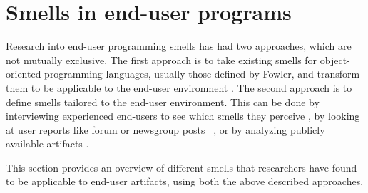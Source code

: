 \documentclass[10pt,conference,compsocconf]{IEEEtran}
\begin{document}
\section{Smells in end-user programs}
\label{sec:smells}
Research into end-user programming smells has had two approaches, which are not mutually exclusive.
The first approach is to take existing smells for object-oriented programming languages, usually those defined by Fowler, and transform them to be applicable to the end-user environment \cite{Hermans2012inter,Hermans2012intra,Stolee2011,StoleeTSE2013}.
The second approach is to define smells tailored to the end-user environment.
This can be done by interviewing experienced end-users to see which smells they perceive \cite{chambers2013smell}, by looking at user reports like forum or newsgroup posts~ \cite{badame2012refactoring,chambers2013smell}, or by analyzing publicly available artifacts \cite{Stolee2011,StoleeTSE2013}.

This section provides an overview of different smells that researchers have found to be applicable to end-user artifacts, using both the above described approaches.
\end{document}
